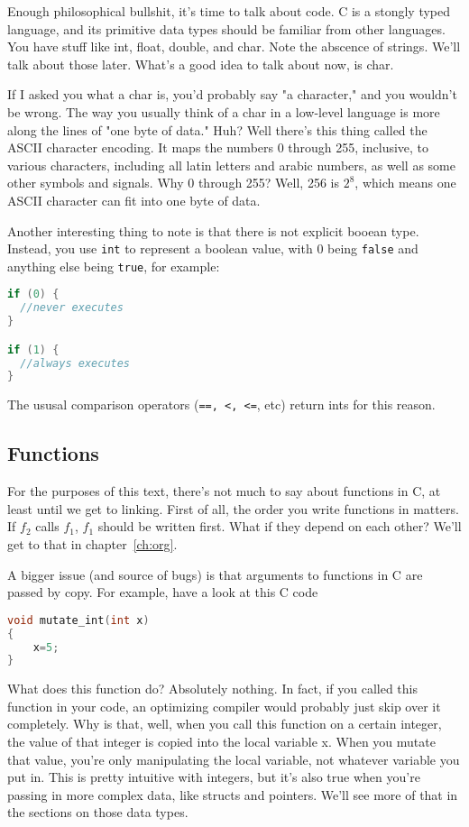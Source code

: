 \documentclass[ebook,11pt,oneside,openany]{memoir}
\begin{document}
Enough philosophical bullshit, it's time to talk about code. C is a stongly typed language, and its primitive data types should be familiar from other languages. You have stuff like int, float, double, and char. Note the abscence of strings. We'll talk about those later. What's a good idea to talk about now, is char. 

If I asked you what a char is, you'd probably say "a character," and you wouldn't be wrong. The way you usually think of a char in a low-level language is more along the lines of "one byte of data." Huh? Well there's this thing called the ASCII character encoding. It maps the numbers 0 through 255, inclusive, to various characters, including all latin letters and arabic numbers, as well as some other symbols and signals. Why 0 through 255? Well, 256 is $2^8$, which means one ASCII character can fit into one byte of data.

Another interesting thing to note is that there is not explicit booean type. Instead, you use \texttt{int} to represent a boolean value, with 0 being \texttt{false} and anything else being \texttt{true}, for example:

\begin{lstlisting}[language=C]
if (0) {
  //never executes
}

if (1) {
  //always executes
}
\end{lstlisting}

The ususal comparison operators (\texttt{==, <, <=}, etc) return ints for this reason.

\subsection{Functions}
For the purposes of this text, there's not much to say about functions in C, at least until we get to linking. First of all, the order you write functions in matters. If $f_2$ calls $f_1$, $f_1$ should be written first. What if they depend on each other? We'll get to that in chapter~\ref{ch:org}.

A bigger issue (and source of bugs) is that arguments to functions in C are passed by copy. For example, have a look at this C code

\begin{lstlisting}[language=C]
void mutate_int(int x)
{
	x=5;
}
\end{lstlisting}

What does this function do? Absolutely nothing. In fact, if you called this function in your code, an optimizing compiler would probably just skip over it completely. Why is that, well, when you call this function on a certain integer, the value of that integer is copied into the local variable x. When you mutate that value, you're only manipulating the local variable, not whatever variable you put in. This is pretty intuitive with integers, but it's also true when you're passing in more complex data, like structs and pointers. We'll see more of that in the sections on those data types.
\end{document}
